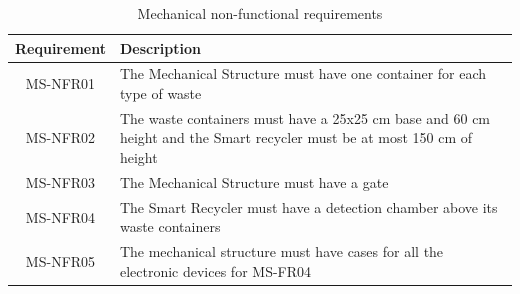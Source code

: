 \documentclass[a4paper,11pt]{article}
\begin{document}
\begin{table}[H]
  \caption{\small{Mechanical non-functional requirements}}
  \begin{center}
    \begin{tabular}{|c|p{95mm}|}
      \hline
      Requirement & Description                                                                                                             \\ \hline
      MS-NFR01    & The Mechanical Structure must have one container for each type of waste                                                 \\ \hline
      MS-NFR02    & The waste containers must have a 25x25 cm base and 60 cm height and the Smart recycler must be at most 150 cm of height \\ \hline
      MS-NFR03    & The Mechanical Structure must have a gate                                                                               \\ \hline
      MS-NFR04    & The Smart Recycler must have a detection chamber above its waste containers                                             \\ \hline
      MS-NFR05    & The mechanical structure must have cases for all the electronic devices for MS-FR04                                     \\ \hline
    \end{tabular}
  \end{center}
  \label{tab:mechanical1}
\end{table}
\end{document}
